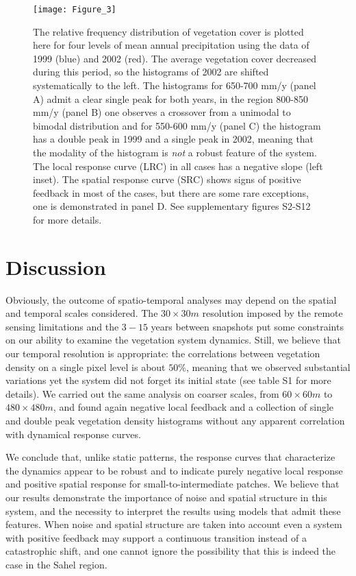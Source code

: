 \documentclass[aps,pre,twocolumn]{revtex4-1}
\begin{document}
\begin{figure*}
\begin{center}
\texttt{[image: Figure\_3]}
\vspace{-0.cm}
\end{center}
\caption{ The relative frequency distribution of vegetation cover is plotted here for four levels of mean annual precipitation using the data of 1999 (blue) and 2002 (red). The average vegetation cover decreased during this period, so the histograms of 2002 are shifted systematically to the left. The histograms for 650-700 mm/y (panel A) admit a clear single  peak for both years, in the region 800-850 mm/y (panel B) one observes a crossover from a unimodal to bimodal distribution and for 550-600 mm/y (panel C) the histogram has a double peak in 1999 and a single peak in 2002, meaning that the modality of the histogram is \emph{not} a robust feature of the system.  The local response curve (LRC) in all cases has a negative slope (left inset). The spatial response curve (SRC) shows signs of positive feedback in most of the cases, but there are some rare exceptions, one is demonstrated in panel D. See supplementary figures S2-S12 for more details.}
 \label{fig3}
\end{figure*}

\section{Discussion}

 Obviously, the outcome of spatio-temporal analyses may depend on the spatial and temporal scales considered. The $30 \times 30 m$ resolution imposed by the remote sensing limitations and the $3-15$ years  between snapshots put some constraints on our ability to examine the vegetation system dynamics. Still, we believe that our temporal resolution is appropriate: the correlations between vegetation density on a single pixel level is about $50\%$, meaning that we observed substantial variations yet the system did not forget its initial state (see table S1 for more details). We carried out the same analysis on coarser scales, from $60 \times 60m$ to $480 \times 480 m$, and found again negative local feedback and a collection of single and double peak vegetation density histograms without any apparent correlation with dynamical response curves.

  We conclude that, unlike static patterns, the response curves that characterize the dynamics appear to be robust and to indicate purely negative local response  and positive spatial response for small-to-intermediate patches.   We believe that our results  demonstrate the importance of noise and spatial structure in this system, and the necessity to interpret the results using models that admit these features. When noise and spatial structure are taken into account  even a system with positive feedback may support a continuous transition instead of a catastrophic shift, and one cannot ignore the possibility that this is indeed  the case in the Sahel region.
\end{document}
